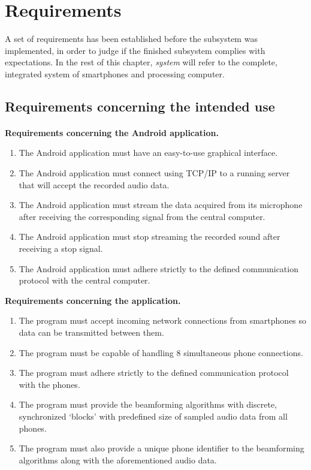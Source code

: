 \documentclass[a4paper, notitlepage]{report}
\begin{document}
\section{Requirements}
\label{sec:requirements}
A set of requirements has been established before the subsystem was implemented, in order to judge if the finished subsystem complies with expectations. In the rest of this chapter, \emph{system} will refer to the complete, integrated system of smartphones and processing computer. 

\subsection{Requirements concerning the intended use}
	\paragraph*{}
\textbf{Requirements concerning the Android application.}
\begin{enumerate}
\item The Android application must have an easy-to-use graphical interface.
\item The Android application must connect using TCP/IP to a running server that will accept the recorded audio data.
\item The Android application must stream the data acquired from its microphone after receiving the corresponding signal from the central computer.
\item The Android application must stop streaming the recorded sound after receiving a stop signal.
\item The Android application must adhere strictly to the defined communication protocol with the central computer.
\end{enumerate}

\textbf{Requirements concerning the \matlab application.}
\begin{enumerate}
\item The \matlab program must accept incoming network connections from smartphones so data can be transmitted between them.
\item The \matlab program must be capable of handling 8 simultaneous phone connections.
\item The \matlab program must adhere strictly to the defined communication protocol with the phones.
\item The \matlab program must provide the beamforming algorithms with discrete, synchronized `blocks' with predefined size of sampled audio data from all phones.
\item The \matlab program must also provide a unique phone identifier to the beamforming algorithms along with the aforementioned audio data.
\end{enumerate}
\end{document}

